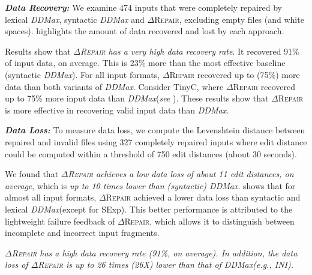 \documentclass[acmsmall,screen,review,anonymous]{acmart}
\newenvironment{result}{\begin{framed}\centering\it}{\end{framed}}
\newcommand{\recheck}[1]{\textcolor{red}{#1}}
\newcommand{\approach}{\textsc{$\Delta$Repair}\xspace}
\newcommand{\ddmax}{\textit{DDMax}\xspace}
\newcommand{\drepair}{\approach}
\begin{document}
\noindent
\textbf{\textit{Data Recovery:}} 
We examine 474 inputs that were completely repaired by %
lexical \ddmax, syntactic \ddmax and \approach, excluding empty files (and white spaces).  %
highlights the amount of data %
recovered and lost %
by each approach.

Results show that \textit{\approach has a very high data recovery rate}. 
It recovered 91\% of input data, on average. 
This is 23\% more than the most effective baseline (syntactic \ddmax). For all input formats, \approach recovered up to (75\%) more data than both variants of \ddmax. Consider TinyC, where \approach recovered up to 75\% more input data than \ddmax (\textit{see} ). These results show that \approach is more effective in recovering valid input data 
than \ddmax.

\vspace{\baselineskip}
\noindent
\textbf{\textit{Data Loss:}} To measure data loss, we compute the Levenshtein distance between repaired and invalid files using %
327 completely repaired inputs %
where edit distance could be computed within a threshold of 750 edit distances (about 30 seconds).

We found that \textit{\approach achieves a low data loss of about 11 edit distances, on average},  which is \textit{up to 10 times lower than (syntactic) \ddmax}.  shows that 
for almost all input formats, \approach achieved a lower data loss than syntactic and lexical \ddmax (except for SExp). This better  performance is attributed to the lightweight failure feedback of \approach, which allows it to distinguish between incomplete and incorrect input fragments.

\begin{result}
\approach has a high data recovery rate (91\%, on average).  
In addition, the data 
loss of \approach is up to 26 times (26X) lower than that of \ddmax (e.g., INI).
\end{result}
\end{document}
